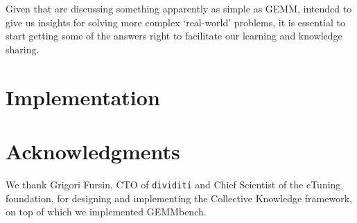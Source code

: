 \documentclass{acm_proc_article-sp} %
\begin{document}
Given that are discussing something apparently as simple as GEMM, intended to
give us insights for solving more complex `real-world' problems, it is
essential to start getting some of the answers right to facilitate our learning
and knowledge sharing.


\section{Implementation}



\section*{Acknowledgments}

We thank Grigori Fursin, CTO of {\tt dividiti} and Chief Scientist of the
cTuning foundation, for designing and implementing the Collective
Knowledge framework, on top of which we implemented GEMMbench.




\end{document}
